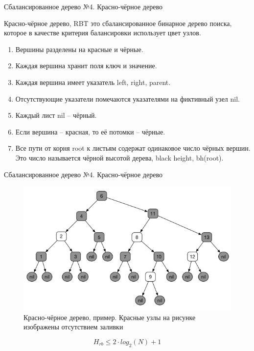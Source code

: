 \documentclass{beamer}
\begin{document}
\begin{frame}[fragile]{Сбалансированное дерево №4. Красно-чёрное дерево}
	\begin{block}{Красно-чёрное дерево, RBT}
		это сбалансированное бинарное дерево поиска, которое в качестве критерия балансировки использует цвет узлов.
	\end{block}

	\begin{enumerate}
		\item Вершины разделены на красные и чёрные.
		\item Каждая вершина хранит поля ключ и значение.
		\item Каждая вершина имеет указатель left, right, parent.
		\item Отсутствующие указатели помечаются указателями на фиктивный узел nil.
		\item Каждый лист nil -- чёрный.
		\item Если вершина -- красная, то её потомки -- чёрные.
		\item Все пути от корня root к листьям содержат одинаковое число чёрных вершин. Это число называется чёрной высотой дерева, black height, bh(root).
	\end{enumerate}
\end{frame}

\begin{frame}[fragile]{Сбалансированное дерево №4. Красно-чёрное дерево}
	\begin{figure}[h]
		\centering
		\includegraphics[scale=0.5]{images/lec07-pic15.png}
		\caption{ Красно-чёрное дерево, пример. Красные узлы на рисунке изображены отсутствием заливки}
	\end{figure}
	\[H_{rb} \leq 2\cdot log_2(N)+1\]	
\end{frame}
\end{document}
